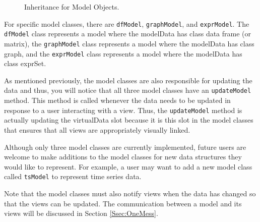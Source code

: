 \documentclass{article}[11pt]
\newcommand{\Rfunction}[1]{{\texttt{#1}}}
\newcommand{\Robject}[1]{{\texttt{#1}}}
\begin{document}
\clearpage

\begin{figure}[ht]
  \begin{center}
    \caption{ Inheritance for Model Objects. }
    \label{Fig:Model}
  \end{center}
\end{figure}

For specific model classes, there are \Robject{dfModel}, \Robject{graphModel},
and \Robject{exprModel}.  The \Robject{dfModel} class represents a model where
the modelData has class data frame (or matrix), the \Robject{graphModel} class
represents a model where the modelData has class graph, and the
\Robject{exprModel} class represents a model where the modelData has class
exprSet. 

As mentioned previously, the model classes are also responsible for updating
the data and thus, you will notice that all three model classes have an
\Rfunction{updateModel} method.  This method is called whenever the data needs
to be updated in response to a user interacting with a view.  Thus, the
\Rfunction{updateModel} method is actually updating the virtualData slot
because it is this slot in the model classes that ensures that all views are
appropriately visually linked.

Although only three model classes are currently implemented, future users are
welcome to make additions to the model classes for new data structures they
would like to represent.  For example, a user may want to add a new model
class called \Robject{tsModel} to represent time series data.  

Note that the model classes must also notify views when the data has changed
so that the views can be updated.  The communication between a model and its
views will be discussed in Section \ref{Ssec:OneMess}. 
\end{document}
